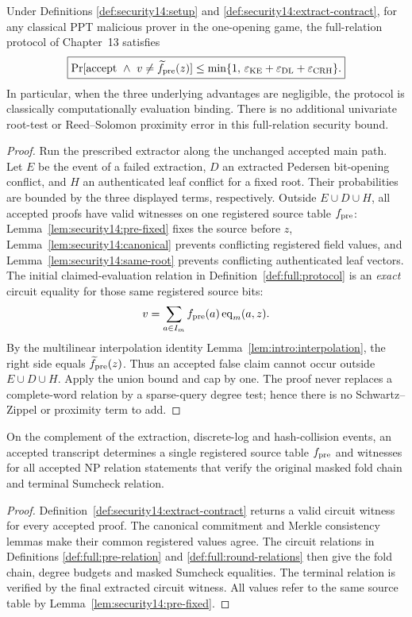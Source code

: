 \begin{theorem}\label{thm:security14:full-binding}
Under Definitions
\ref{def:security14:setup} and
\ref{def:security14:extract-contract},
for any classical PPT malicious
prover in the one-opening game,
the full-relation protocol of
Chapter~13 satisfies
\[
 \boxed{\Pr[\mathrm{accept}\ \wedge\
 v\neq\widetilde f_{\rm pre}(z)]
 \le\min\{1,\,
 \varepsilon_{\rm KE}
 +\varepsilon_{\rm DL}
 +\varepsilon_{\rm CRH}\}.}
\]
In particular, when the three
underlying advantages are negligible,
the protocol is classically
computationally evaluation binding.
There is no additional univariate
root-test or Reed--Solomon proximity
error in this full-relation
security bound.
\end{theorem}
\begin{proof}
Run the prescribed extractor
along the unchanged accepted
main path. Let $E$ be the
event of a failed extraction,
$D$ an extracted Pedersen
bit-opening conflict, and
$H$ an authenticated leaf
conflict for a fixed root.
Their probabilities are bounded
by the three displayed terms,
respectively. Outside
$E\cup D\cup H$, all
accepted proofs have valid
witnesses on one registered
source table $f_{\rm pre}$:
Lemma~\ref{lem:security14:pre-fixed}
fixes the source before $z$,
Lemma~\ref{lem:security14:canonical}
prevents conflicting
registered field values,
and Lemma~\ref{lem:security14:same-root}
prevents conflicting
authenticated leaf vectors.
The initial claimed-evaluation
relation in
Definition~\ref{def:full:protocol}
is an \emph{exact} circuit
equality for those same
registered source bits:
\[
 v=\sum_{a\in I_m}
 f_{\rm pre}(a)\operatorname{eq}_m(a,z).
\]
By the multilinear
interpolation identity
Lemma~\ref{lem:intro:interpolation},
the right side equals
$\widetilde f_{\rm pre}(z)$.
Thus an accepted false claim
cannot occur outside
$E\cup D\cup H$.
Apply the union bound and
cap by one. The proof never
replaces a complete-word
relation by a sparse-query
degree test; hence there is
no Schwartz--Zippel or
proximity term to add.
\end{proof}

\begin{corollary}\label{cor:security14:knowledge}
On the complement of the
extraction, discrete-log and
hash-collision events, an
accepted transcript determines
a single registered source
table $f_{\rm pre}$ and
witnesses for all accepted
NP relation statements that
verify the original masked
fold chain and terminal
Sumcheck relation.
\end{corollary}
\begin{proof}
Definition~\ref{def:security14:extract-contract}
returns a valid circuit
witness for every accepted
proof. The canonical commitment
and Merkle consistency
lemmas make their common
registered values agree.
The circuit relations in
Definitions
\ref{def:full:pre-relation} and
\ref{def:full:round-relations}
then give the fold chain,
degree budgets and masked
Sumcheck equalities.
The terminal relation is
verified by the final
extracted circuit witness.
All values refer to the
same source table by
Lemma~\ref{lem:security14:pre-fixed}.
\end{proof}

